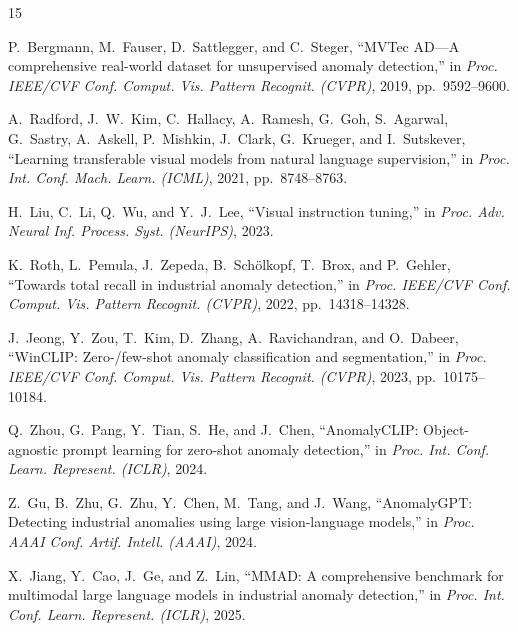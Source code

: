 \documentclass[conference]{IEEEtran}
\begin{document}
\begin{thebibliography}{15}

P.~Bergmann, M.~Fauser, D.~Sattlegger, and C.~Steger,
``MVTec AD---A comprehensive real-world dataset for unsupervised anomaly detection,''
in \textit{Proc. IEEE/CVF Conf. Comput. Vis. Pattern Recognit. (CVPR)}, 2019, pp.~9592--9600.

A.~Radford, J.~W.~Kim, C.~Hallacy, A.~Ramesh, G.~Goh, S.~Agarwal, G.~Sastry, A.~Askell, P.~Mishkin, J.~Clark, G.~Krueger, and I.~Sutskever,
``Learning transferable visual models from natural language supervision,''
in \textit{Proc. Int. Conf. Mach. Learn. (ICML)}, 2021, pp.~8748--8763.

H.~Liu, C.~Li, Q.~Wu, and Y.~J.~Lee,
``Visual instruction tuning,''
in \textit{Proc. Adv. Neural Inf. Process. Syst. (NeurIPS)}, 2023.

K.~Roth, L.~Pemula, J.~Zepeda, B.~Sch{\"o}lkopf, T.~Brox, and P.~Gehler,
``Towards total recall in industrial anomaly detection,''
in \textit{Proc. IEEE/CVF Conf. Comput. Vis. Pattern Recognit. (CVPR)}, 2022, pp.~14318--14328.

J.~Jeong, Y.~Zou, T.~Kim, D.~Zhang, A.~Ravichandran, and O.~Dabeer,
``WinCLIP: Zero-/few-shot anomaly classification and segmentation,''
in \textit{Proc. IEEE/CVF Conf. Comput. Vis. Pattern Recognit. (CVPR)}, 2023, pp.~10175--10184.

Q.~Zhou, G.~Pang, Y.~Tian, S.~He, and J.~Chen,
``AnomalyCLIP: Object-agnostic prompt learning for zero-shot anomaly detection,''
in \textit{Proc. Int. Conf. Learn. Represent. (ICLR)}, 2024.

Z.~Gu, B.~Zhu, G.~Zhu, Y.~Chen, M.~Tang, and J.~Wang,
``AnomalyGPT: Detecting industrial anomalies using large vision-language models,''
in \textit{Proc. AAAI Conf. Artif. Intell. (AAAI)}, 2024.

X.~Jiang, Y.~Cao, J.~Ge, and Z.~Lin,
``MMAD: A comprehensive benchmark for multimodal large language models in industrial anomaly detection,''
in \textit{Proc. Int. Conf. Learn. Represent. (ICLR)}, 2025.



\end{thebibliography}
\end{document}
